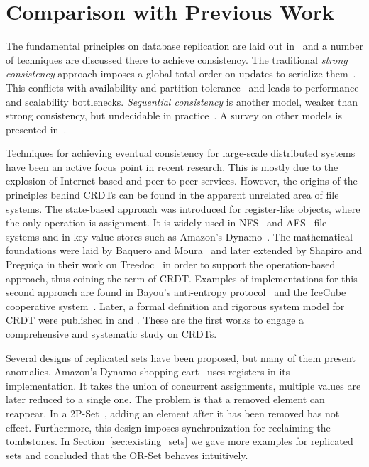 \section{Comparison with Previous Work}
\label{sec:previous_work}

The fundamental principles on database replication are laid out
in~\cite{lindsay} and a number of techniques are discussed there to achieve
consistency. The traditional \textit{strong consistency} approach imposes a
global total order on updates to serialize
them~\cite{Lamport:1978:TCO:359545.359563}. This conflicts with availability and
partition-tolerance~\cite{Gilbert:2002:BCF:564585.564601} and leads to
performance and scalability bottlenecks. \textit{Sequential consistency} is
another model, weaker than strong consistency, but undecidable in
practice~\cite{Qadeer:2003:VSC:939835.940001}. A survey on other models is
presented in~\cite{Mosberger:1993:MCM:160551.160553}.

Techniques for achieving eventual consistency for large-scale distributed
systems have been an active focus point in recent research. This is mostly due
to the explosion of Internet-based and peer-to-peer services. However, the
origins of the principles behind CRDTs can be found in the apparent unrelated
area of file systems. The state-based approach was introduced for register-like
objects, where the only operation is assignment. It is widely used in
NFS~\cite{Sandberg85designand} and AFS~\cite{Howard:1988:SPD:35037.35059} file
systems and in key-value stores such as Amazon's
Dynamo~\cite{DeCandia:2007:DAH:1294261.1294281}. The mathematical foundations
were laid by Baquero and Moura~\cite{scadt4} and later extended by Shapiro and
Pregui\c{c}a in their work on Treedoc~\cite{Preguica:2009:CRD:1584339.1584604}
in order to support the operation-based approach, thus coining the term of CRDT.
Examples of implementations for this second approach are found in Bayou's
anti-entropy protocol~\cite{Petersen:1997:FUP:268998.266711} and the IceCube
cooperative system~\cite{preguica:inria-00445758}. Later, a formal definition
and rigorous system model for CRDT were published in
\cite{shapiro:inria-00555588} and \cite{Shapiro:2011:CRD:2050613.2050642}.
These are the first works to engage a comprehensive and systematic study on
CRDTs.

Several designs of replicated sets have been proposed, but many of them present
anomalies. Amazon's Dynamo shopping
cart~\cite{DeCandia:2007:DAH:1294261.1294281} uses registers in its
implementation. It takes the union of concurrent assignments, multiple values
are later reduced to a single one. The problem is that a removed element can
reappear. In a 2P-Set~\cite{Wuu:1984:ESR:800222.806750}, adding an element after
it has been removed has not effect. Furthermore, this design imposes
synchronization for reclaiming the tombstones. In
Section~\ref{sec:existing_sets} we gave more examples for replicated sets and
concluded that the OR-Set behaves intuitively.
